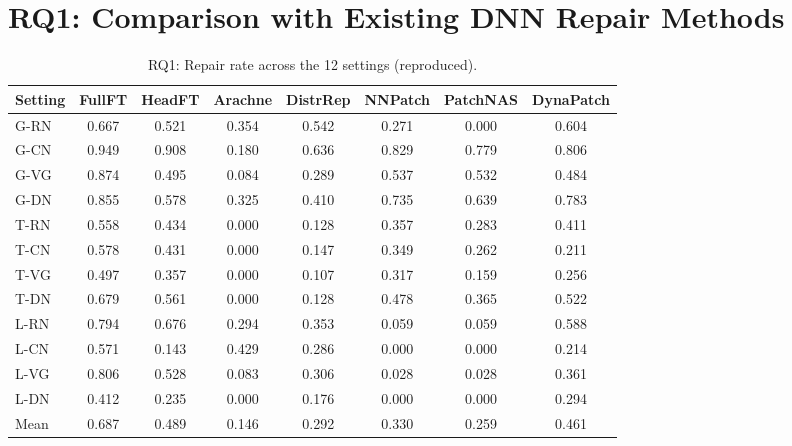 \documentclass{article}
\begin{document}
\section*{RQ1: Comparison with Existing DNN Repair Methods}

\begin{table}[h]
\centering
\caption{RQ1: Repair rate across the 12 settings (reproduced).}
\label{tab:repro_rq1_rr}
\small
\begin{tabular}{lccccccc}
\toprule
Setting & FullFT & HeadFT & Arachne & DistrRep & NNPatch & PatchNAS & DynaPatch \\
\midrule
G-RN & 0.667 & 0.521 & 0.354 & 0.542 & 0.271 & 0.000 & 0.604 \\
G-CN & 0.949 & 0.908 & 0.180 & 0.636 & 0.829 & 0.779 & 0.806 \\
G-VG & 0.874 & 0.495 & 0.084 & 0.289 & 0.537 & 0.532 & 0.484 \\
G-DN & 0.855 & 0.578 & 0.325 & 0.410 & 0.735 & 0.639 & 0.783 \\
\midrule
T-RN & 0.558 & 0.434 & 0.000 & 0.128 & 0.357 & 0.283 & 0.411 \\
T-CN & 0.578 & 0.431 & 0.000 & 0.147 & 0.349 & 0.262 & 0.211 \\
T-VG & 0.497 & 0.357 & 0.000 & 0.107 & 0.317 & 0.159 & 0.256 \\
T-DN & 0.679 & 0.561 & 0.000 & 0.128 & 0.478 & 0.365 & 0.522 \\
\midrule
L-RN & 0.794 & 0.676 & 0.294 & 0.353 & 0.059 & 0.059 & 0.588 \\
L-CN & 0.571 & 0.143 & 0.429 & 0.286 & 0.000 & 0.000 & 0.214 \\
L-VG & 0.806 & 0.528 & 0.083 & 0.306 & 0.028 & 0.028 & 0.361 \\
L-DN & 0.412 & 0.235 & 0.000 & 0.176 & 0.000 & 0.000 & 0.294 \\
\midrule
Mean & 0.687 & 0.489 & 0.146 & 0.292 & 0.330 & 0.259 & 0.461 \\
\bottomrule
\end{tabular}
\end{table}
\end{document}
